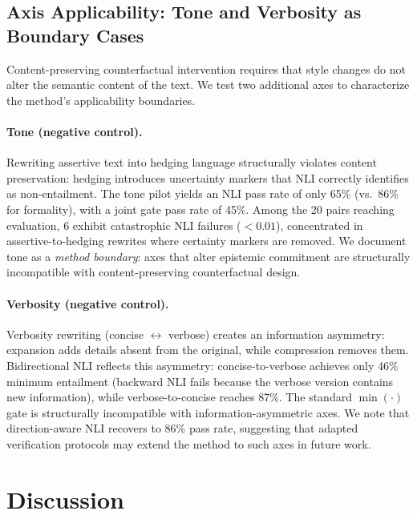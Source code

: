 \documentclass[11pt,a4paper]{article}
\begin{document}
\subsection{Axis Applicability: Tone and Verbosity as Boundary Cases}
\label{sec:axis_boundaries}

Content-preserving counterfactual intervention requires that style changes do not alter the semantic content of the text.
We test two additional axes to characterize the method's applicability boundaries.

\paragraph{Tone (negative control).}
Rewriting assertive text into hedging language structurally violates content preservation: hedging introduces uncertainty markers that NLI correctly identifies as non-entailment.
The tone pilot yields an NLI pass rate of only 65\% (vs.\ 86\% for formality), with a joint gate pass rate of 45\%.
Among the 20 pairs reaching evaluation, 6 exhibit catastrophic NLI failures ($<0.01$), concentrated in assertive-to-hedging rewrites where certainty markers are removed.
We document tone as a \emph{method boundary}: axes that alter epistemic commitment are structurally incompatible with content-preserving counterfactual design.

\paragraph{Verbosity (negative control).}
Verbosity rewriting (concise $\leftrightarrow$ verbose) creates an information asymmetry: expansion adds details absent from the original, while compression removes them.
Bidirectional NLI reflects this asymmetry: concise-to-verbose achieves only 46\% minimum entailment (backward NLI fails because the verbose version contains new information), while verbose-to-concise reaches 87\%.
The standard $\min(\cdot)$ gate is structurally incompatible with information-asymmetric axes.
We note that direction-aware NLI recovers to 86\% pass rate, suggesting that adapted verification protocols may extend the method to such axes in future work.

\section{Discussion}
\end{document}
